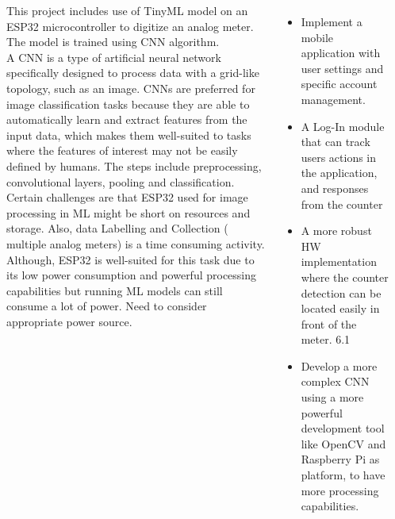 \documentclass[25pt,a0paper, portrait]{tikzposter}
\begin{document}
\begin{columns}
		
		{
			{
				This project includes use of TinyML model on an ESP32 microcontroller to digitize an analog meter. The model is trained using CNN algorithm.\\
				A CNN is a type of artificial neural network specifically designed to process data with a grid-like topology, such as an image. CNNs are preferred for image classification tasks because they are able to automatically learn and extract features from the input data, which makes them well-suited to tasks where the features of interest may not be easily defined by humans. The steps include preprocessing, convolutional layers, pooling and classification.\\
				
				Certain challenges are that ESP32 used for image processing in ML might be short on resources and storage. Also, data Labelling and Collection ( multiple analog meters) is a time consuming activity. Although, ESP32 is well-suited for this task due to its low power consumption and powerful processing capabilities but running ML models can still consume a lot of power. Need to consider appropriate power source.
			}
			{
				\begin{itemize}
					\item Implement a mobile application with user settings and specific account management.
					\item A Log-In module that can track users actions in the application, and responses from the counter
					\item A more robust HW implementation where the counter detection can be located easily in front of the meter. 6.1
					\item Develop a more complex CNN using a more powerful development tool like OpenCV and Raspberry Pi as platform, to have more processing capabilities.
				\end{itemize}
			}
		{
			\begin{tikzfigure}

\end{tikzfigure}}}
\end{columns}
\end{document}
